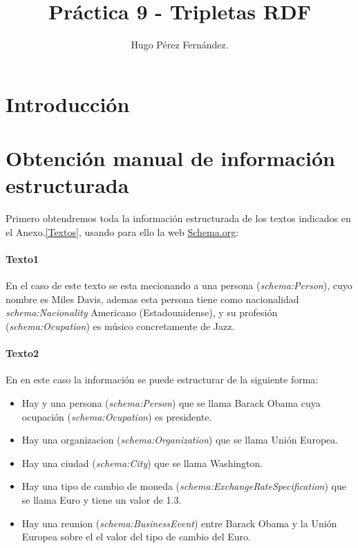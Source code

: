 \documentclass[spanish]{llncs}   %
\begin{document}
\title{Práctica 9 - Tripletas RDF}

\author{Hugo Pérez Fernández.  
}
\maketitle              

\section{Introducción}


\section{Obtención manual de información estructurada}

Primero obtendremos toda la información estructurada de los textos indicados en el Anexo.\ref{Textos}, usando para ello la web \href{https://schema.org}{Schema.org}:

\paragraph{Texto1}

En el caso de este texto se esta mecionando a una persona (\textit{schema:Person}), cuyo nombre es Miles Davis, ademas esta persona tiene como nacionalidad \textit{schema:Nacionality}
Americano (Estadounidense), y su profesión (\textit{schema:Ocupation}) es músico concretamente de Jazz.

\paragraph{Texto2}

En en este caso la información se puede estructurar de la siguiente forma:

\begin{itemize}
    \item Hay y una persona (\textit{schema:Person}) que se llama Barack Obama cuya ocupación (\textit{schema:Ocupation}) es presidente.
    \item Hay una organizacion (\textit{schema:Organization}) que se llama Unión Europea.
    \item Hay una ciudad (\textit{schema:City}) que se llama Washington.
    \item Hay una tipo de cambio de moneda (\textit{schema:ExchangeRateSpecification}) que se llama Euro y tiene un valor de 1.3.
    \item Hay una reunion (\textit{schema:BusinessEvent}) entre Barack Obama y la Unión Europea
    sobre el el valor del tipo de cambio del Euro.
\end{itemize}
\end{document}
